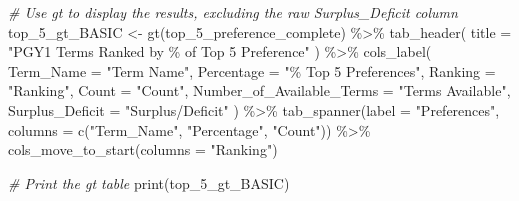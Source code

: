 \documentclass[
]{article}
\newenvironment{Shaded}{\begin{snugshade}}{\end{snugshade}}
\newcommand{\AttributeTok}[1]{\textcolor[rgb]{0.77,0.63,0.00}{#1}}
\newcommand{\CommentTok}[1]{\textcolor[rgb]{0.56,0.35,0.01}{\textit{#1}}}
\newcommand{\FunctionTok}[1]{\textcolor[rgb]{0.00,0.00,0.00}{#1}}
\newcommand{\NormalTok}[1]{#1}
\newcommand{\OtherTok}[1]{\textcolor[rgb]{0.56,0.35,0.01}{#1}}
\newcommand{\SpecialCharTok}[1]{\textcolor[rgb]{0.00,0.00,0.00}{#1}}
\newcommand{\StringTok}[1]{\textcolor[rgb]{0.31,0.60,0.02}{#1}}
\begin{document}
\begin{Shaded}
\begin{Highlighting}[]
\CommentTok{\# Use gt to display the results, excluding the raw Surplus\_Deficit column}
\NormalTok{top\_5\_gt\_BASIC }\OtherTok{\textless{}{-}} \FunctionTok{gt}\NormalTok{(top\_5\_preference\_complete) }\SpecialCharTok{\%\textgreater{}\%}
  \FunctionTok{tab\_header}\NormalTok{(}
    \AttributeTok{title =} \StringTok{"PGY1 Terms Ranked by \% of Top 5 Preference"}
\NormalTok{  ) }\SpecialCharTok{\%\textgreater{}\%}
  \FunctionTok{cols\_label}\NormalTok{(}
    \AttributeTok{Term\_Name =} \StringTok{"Term Name"}\NormalTok{,}
    \AttributeTok{Percentage =} \StringTok{"\% Top 5 Preferences"}\NormalTok{,}
    \AttributeTok{Ranking =} \StringTok{"Ranking"}\NormalTok{,}
    \AttributeTok{Count =} \StringTok{"Count"}\NormalTok{,}
    \AttributeTok{Number\_of\_Available\_Terms =} \StringTok{"Terms Available"}\NormalTok{,}
    \AttributeTok{Surplus\_Deficit =} \StringTok{"Surplus/Deficit"}
\NormalTok{  ) }\SpecialCharTok{\%\textgreater{}\%}
  \FunctionTok{tab\_spanner}\NormalTok{(}\AttributeTok{label =} \StringTok{"Preferences"}\NormalTok{, }\AttributeTok{columns =} \FunctionTok{c}\NormalTok{(}\StringTok{"Term\_Name"}\NormalTok{, }\StringTok{"Percentage"}\NormalTok{, }\StringTok{"Count"}\NormalTok{)) }\SpecialCharTok{\%\textgreater{}\%}
  \FunctionTok{cols\_move\_to\_start}\NormalTok{(}\AttributeTok{columns =} \StringTok{"Ranking"}\NormalTok{)}

\CommentTok{\# Print the gt table}
\FunctionTok{print}\NormalTok{(top\_5\_gt\_BASIC)}
\end{Highlighting}
\end{Shaded}
\end{document}
